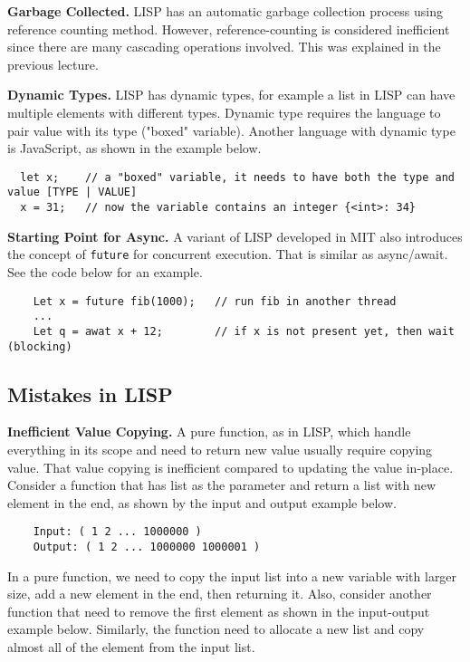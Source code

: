 \documentclass[twoside]{article}
\begin{document}
\textbf{Garbage Collected. } LISP has an automatic garbage collection process using reference counting method. However, reference-counting is considered inefficient since there are many cascading operations involved. This was explained in the previous lecture. 

\textbf{Dynamic Types. } LISP has dynamic types, for example a list in LISP can have multiple elements with different types. Dynamic type requires the language to pair value with its type ("boxed" variable). Another language with dynamic type is JavaScript, as shown in the example below.

\begin{verbatim}
  let x;    // a "boxed" variable, it needs to have both the type and value [TYPE | VALUE]
  x = 31;   // now the variable contains an integer {<int>: 34}
\end{verbatim}

\newpage
\textbf{Starting Point for Async. } A variant of LISP developed in MIT also introduces the concept of \verb|future| for concurrent execution. That is similar as async/await. See the code below for an example.

\begin{verbatim}
    Let x = future fib(1000);   // run fib in another thread
    ...
    Let q = awat x + 12;        // if x is not present yet, then wait (blocking)
\end{verbatim}

\subsection{Mistakes in LISP}

\textbf{Inefficient Value Copying.} 
A pure function, as in LISP, which handle everything in its scope and need to return new value usually require copying value. That value copying is inefficient compared to updating the value in-place. Consider a function that has list as the parameter and return a list with new element in the end, as shown by the input and output example below.

\begin{verbatim}
    Input: ( 1 2 ... 1000000 )
    Output: ( 1 2 ... 1000000 1000001 )
\end{verbatim}

In a pure function, we need to copy the input list into a new variable with larger size, add a new element in the end, then returning it. Also, consider another function that need to remove the first element as shown in the input-output example below. Similarly, the function need to allocate a new list and copy almost all of the element from the input list.
\end{document}

